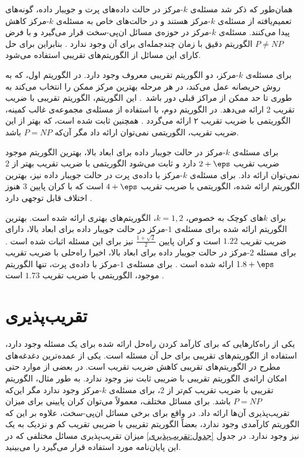 همان‌طور که ذکر شد مسئله‌ی $k$-مرکز در حالت داده‌های پرت و جویبار داده، گونه‌های تعمیم‌یافته از مسئله‌ی $k$-مرکز هستند و در حالت‌های خاص به مسئله‌ی $k$-مرکز کاهش پیدا می‌کنند.
مسئله‌ی $k$-مرکز در حوزه‌ی مسائل ان‌پی-سخت قرار می‌گیرد و با فرض $P \neq NP$ الگوریتم دقیق با زمان چندجمله‌ای برای آن وجود ندارد \cite{michael1979computers}.
بنابراین برای حل کارای این مسائل از الگوریتم‌های تقریبی استفاده می‌شود.

برای مسئله‌ی $k$-مرکز، دو الگوریتم تقریبی معروف وجود دارد.
در الگوریتم اول، که به روش حریصانه عمل می‌کند، در هر مرحله بهترین مرکز ممکن را انتخاب می‌کند به طوری تا حد ممکن از مراکز قبلی دور باشد~\cite{megiddo1984complexity}.
این الگوریتم، الگوریتم تقریبی با ضریب تقریب 2 ارائه می‌دهد.
در الگوریتم دوم، با استفاده از مسئله‌ی مجموعه‌ی غالب کمینه، الگوریتمی با ضریب تقریب ۲ ارائه می‌گردد \cite{vazirani2013approximation}.
همچنین ثابت شده است، که بهتر از این ضریب تقریب، الگوریتمی نمی‌توان ارائه داد مگر آن‌که $P = NP$ باشد.

برای مسئله‌ی $k$-مرکز در حالت جویبار داده برای ابعاد بالا، بهترین الگوریتم موجود ضریب تقریب $2 + \eps$ دارد \cite{mccutchen2008streaming, guha2009tight, ahn2014computing} و ثابت می‌شود الگوریتمی با ضریب تقریب بهتر از $2$ نمی‌توان ارائه داد. برای مسئله‌ی $k$-مرکز با داده‌ی پرت در حالت جویبار داده نیز، بهترین الگوریتم ارائه شده، الگوریتمی با ضریب تقریب $4 + \eps$ است که با کران پایین $3$ هنوز اختلاف قابل توجهی دارد \cite{charikar2001algorithms}. 

برای $k$های کوچک به خصوص، $k =1, 2$، الگوریتم‌های بهتری ارائه شده است. بهترین الگوریتم ارائه شده برای مسئله‌ی $1$-مرکز در حالت جویبار داده برای ابعاد بالا، دارای ضریب تقریب $1.22$ است و کران پایین $\frac{1 + \sqrt{2}}{2}$ نیز برای این مسئله اثبات شده است \cite{agarwal2010streaming, chan2014streaming}. برای مسئله $2$-مرکز در حالت جویبار داده برای ابعاد بالا، اخیرا راه‌حلی با ضریب تقریب $1.8 + \eps$ ارائه شده است \cite{kim2014improved}. برای مسئله‌ی $1$-مرکز با داده‌ی پرت، تنها الگوریتم موجود، الگوریتمی با ضریب تقریب $1.73$ است \cite{zarrabi2009streaming}.

\section{تقریب‌پذیری}

یکی از راه‌کارهایی که برای کارآمد کردن راه‌حل ارائه شده برای یک مسئله وجود دارد، استفاده از الگوریتم‌های تقریبی برای حل آن مسئله است.
یکی از عمده‌ترین دغدغه‌های مطرح در الگوریتم‌های تقریبی کاهش ضریب تقریب است.
در بعضی از موارد حتی امکان ارائه‌ی الگوریتم تقریبی با ضریبی ثابت نیز وجود ندارد.
به طور مثال، الگوریتم تقریبی با ضریب تقریب کم‌تر از $2$، برای مسئله‌ی $k$-مرکز وجود ندارد مگر این‌که $P = NP$ باشد.
برای مسائل مختلف، معمولاً می‌توان کران پایینی برای میزان تقریب‌پذیری آن‌ها ارائه داد.
در واقع برای برخی مسائل ان‌پی-سخت، علاوه بر این که الگوریتم کارآمدی وجود ندارد، بعضاً الگوریتم تقریبی با ضریبی تقریب کم و نزدیک به یک نیز وجود ندارد.
در جدول \ref{جدول:تقریب‌پذیری}  میزان تقریب‌پذیری مسائل مختلفی که در این پایان‌نامه مورد استفاده قرار می‌گیرد را می‌بینید.



